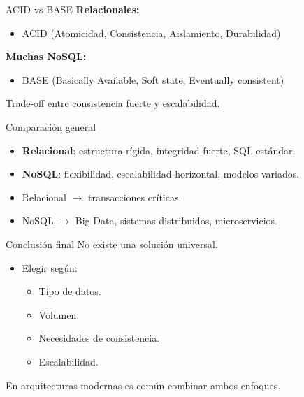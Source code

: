 \documentclass{beamer}
\begin{document}
\begin{frame}{ACID vs BASE}
\textbf{Relacionales:}
\begin{itemize}
    \item ACID (Atomicidad, Consistencia, Aislamiento, Durabilidad)
\end{itemize}

\textbf{Muchas NoSQL:}
\begin{itemize}
    \item BASE (Basically Available, Soft state, Eventually consistent)
\end{itemize}

\medskip
Trade-off entre consistencia fuerte y escalabilidad.
\end{frame}

\begin{frame}{Comparación general}
\begin{itemize}
    \item \textbf{Relacional}: estructura rígida, integridad fuerte, SQL estándar.
    \item \textbf{NoSQL}: flexibilidad, escalabilidad horizontal, modelos variados.
    \item Relacional $\rightarrow$ transacciones críticas.
    \item NoSQL $\rightarrow$ Big Data, sistemas distribuidos, microservicios.
\end{itemize}
\end{frame}

\begin{frame}{Conclusión final}
No existe una solución universal.

\begin{itemize}
    \item Elegir según:
    \begin{itemize}
        \item Tipo de datos.
        \item Volumen.
        \item Necesidades de consistencia.
        \item Escalabilidad.
    \end{itemize}
\end{itemize}

En arquitecturas modernas es común combinar ambos enfoques.
\end{frame}
\end{document}
